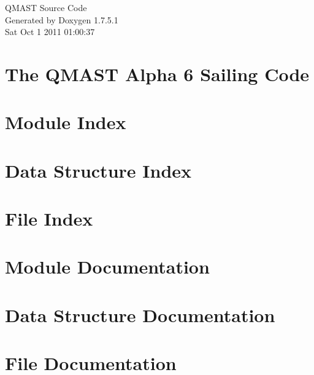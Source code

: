 \documentclass[a4paper]{book}
\begin{document}
\hypersetup{pageanchor=false,citecolor=blue}
\begin{titlepage}
\vspace*{7cm}
\begin{center}
{\Large \-Q\-M\-A\-S\-T \-Source \-Code }\\
\vspace*{1cm}
{\large \-Generated by Doxygen 1.7.5.1}\\
\vspace*{0.5cm}
{\small Sat Oct 1 2011 01:00:37}\\
\end{center}
\end{titlepage}
\clearemptydoublepage
{}
\tableofcontents
\clearemptydoublepage
{}
\hypersetup{pageanchor=true,citecolor=blue}
\chapter{\-The \-Q\-M\-A\-S\-T \-Alpha 6 \-Sailing \-Code}
\label{index}\hypertarget{index}{}
\chapter{\-Module \-Index}

\chapter{\-Data \-Structure \-Index}

\chapter{\-File \-Index}

\chapter{\-Module \-Documentation}


\chapter{\-Data \-Structure \-Documentation}

\chapter{\-File \-Documentation}














\printindex
\end{document}
